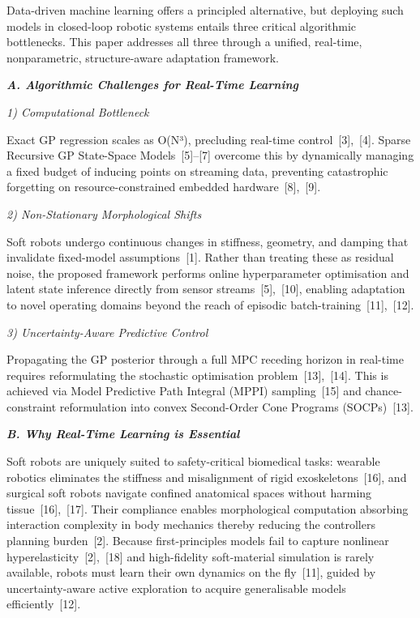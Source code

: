 \documentclass[letterpaper, 10pt, journal, twoside]{IEEEtran}
\begin{document}
Data-driven machine learning offers a principled alternative, but
deploying such models in closed-loop robotic systems entails three
critical algorithmic bottlenecks. This paper addresses all three through
a unified, real-time, nonparametric, structure-aware adaptation
framework.

\emph{\textbf{A. Algorithmic Challenges for Real-Time Learning}}

\emph{1) Computational Bottleneck}

Exact GP regression scales as O(N³), precluding real-time
control~{[}3{]},~{[}4{]}. Sparse Recursive GP State-Space
Models~{[}5{]}--{[}7{]} overcome this by dynamically managing a fixed
budget of inducing points on streaming data, preventing catastrophic
forgetting on resource-constrained embedded hardware~{[}8{]},~{[}9{]}.

\emph{2) Non-Stationary Morphological Shifts}

Soft robots undergo continuous changes in stiffness, geometry, and
damping that invalidate fixed-model assumptions~{[}1{]}. Rather than
treating these as residual noise, the proposed framework performs online
hyperparameter optimisation and latent state inference directly from
sensor streams~{[}5{]},~{[}10{]}, enabling adaptation to novel operating
domains beyond the reach of episodic batch-training~{[}11{]},~{[}12{]}.

\emph{3) Uncertainty-Aware Predictive Control}

Propagating the GP posterior through a full MPC receding horizon in
real-time requires reformulating the stochastic optimisation
problem~{[}13{]},~{[}14{]}. This is achieved via Model Predictive Path
Integral (MPPI) sampling~{[}15{]} and chance-constraint reformulation
into convex Second-Order Cone Programs (SOCPs)~{[}13{]}.

\emph{\textbf{B. Why Real-Time Learning is Essential}}

Soft robots are uniquely suited to safety-critical biomedical tasks:
wearable robotics eliminates the stiffness and misalignment of rigid
exoskeletons~{[}16{]}, and surgical soft robots navigate confined
anatomical spaces without harming tissue~{[}16{]},~{[}17{]}. Their
compliance enables morphological computation absorbing interaction
complexity in body mechanics thereby reducing the
controller\textquotesingle s planning burden~{[}2{]}. Because
first-principles models fail to capture nonlinear
hyperelasticity~{[}2{]},~{[}18{]} and high-fidelity soft-material
simulation is rarely available, robots must learn their own dynamics on
the fly~{[}11{]}, guided by uncertainty-aware active exploration to
acquire generalisable models efficiently~{[}12{]}.
\end{document}
